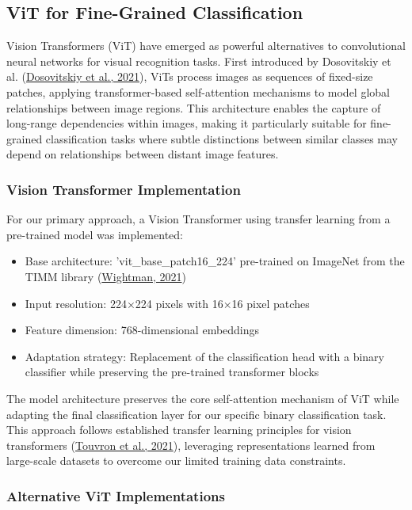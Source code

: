 \documentclass[a4paper,12pt]{report}
\begin{document}
\subsection{ViT for Fine-Grained Classification}

Vision Transformers (ViT) have emerged as powerful alternatives to convolutional neural networks for visual recognition tasks. First introduced by Dosovitskiy et al. (\href{https://arxiv.org/abs/2010.11929}{Dosovitskiy et al., 2021}), ViTs process images as sequences of fixed-size patches, applying transformer-based self-attention mechanisms to model global relationships between image regions. This architecture enables the capture of long-range dependencies within images, making it particularly suitable for fine-grained classification tasks where subtle distinctions between similar classes may depend on relationships between distant image features.

\subsubsection{Vision Transformer Implementation}

For our primary approach, a Vision Transformer using transfer learning from a pre-trained model was implemented:

\begin{itemize}
    \item Base architecture: 'vit\_base\_patch16\_224' pre-trained on ImageNet from the TIMM library (\href{https://github.com/rwightman/pytorch-image-models}{Wightman, 2021})
    \item Input resolution: 224×224 pixels with 16×16 pixel patches
    \item Feature dimension: 768-dimensional embeddings
    \item Adaptation strategy: Replacement of the classification head with a binary classifier while preserving the pre-trained transformer blocks
\end{itemize}

The model architecture preserves the core self-attention mechanism of ViT while adapting the final classification layer for our specific binary classification task. This approach follows established transfer learning principles for vision transformers (\href{https://arxiv.org/abs/2012.12877}{Touvron et al., 2021}), leveraging representations learned from large-scale datasets to overcome our limited training data constraints.

\subsubsection{Alternative ViT Implementations}
\end{document}
